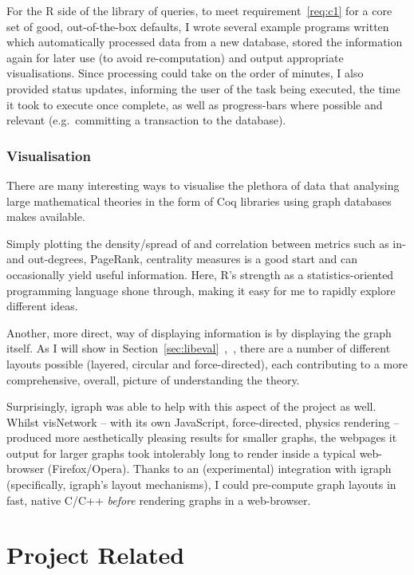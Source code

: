 For the R side of the library of queries, to meet requirement~\ref{req:c1} for
a core set of good, out-of-the-box defaults, I wrote several example programs
written which automatically processed data from a new database, stored the
information again for later use (to avoid re-computation) and output
appropriate visualisations. Since processing could take on the order of
minutes, I also provided status updates, informing the user of the task being
executed, the time it took to execute once complete, as well as progress-bars
where possible and relevant (e.g.\ committing a transaction to the database).

\subsubsection{Visualisation}

There are many interesting ways to visualise the plethora of data that
analysing large mathematical theories in the form of Coq libraries using graph
databases makes available.

Simply plotting the density/spread of and correlation between metrics such as
in- and out-degrees, PageRank, centrality measures is a good start and can
occasionally yield useful information. Here, R's strength as a
statistics-oriented programming language shone through, making it easy for me
to rapidly explore different ideas.

Another, more direct, way of displaying information is by displaying the graph
itself. As I will show in
Section~\ref{sec:libeval}~,~, there
are a number of different layouts possible (layered, circular and
force-directed), each contributing to a more comprehensive, overall, picture of
understanding the theory.

Surprisingly, igraph was able to help with this aspect of the project as well.
Whilst visNetwork -- with its own JavaScript, force-directed, physics rendering
-- produced more aesthetically pleasing results for smaller graphs, the webpages
it output for larger graphs took intolerably long to render inside a typical
web-browser (Firefox/Opera). Thanks to an (experimental) integration with igraph
(specifically, igraph's layout mechanisms), I could pre-compute graph layouts in
fast, native C/C++ \emph{before} rendering graphs in a web-browser.

\section{Project Related}

